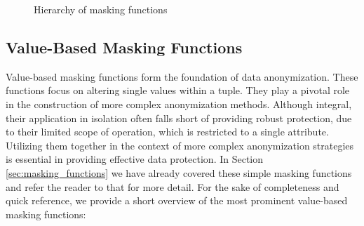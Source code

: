 \begin{figure}[ht]
    \vspace{-0.75cm}
    \caption{Hierarchy of masking functions}\label{fig:hierarchy_mf} 
\end{figure}

\subsection{Value-Based Masking Functions}
Value-based masking functions form the foundation of data anonymization. These functions focus on altering single values within a tuple. They play a pivotal role in the construction of more complex anonymization methods. Although integral, their application in isolation often falls short of providing robust protection, due to their limited scope of operation, which is restricted to a single attribute. Utilizing them together in the context of more complex anonymization strategies is essential in providing effective data protection. In Section \ref{sec:masking_functions} we have already covered these simple masking functions and refer the reader to that for more detail. For the sake of completeness and quick reference, we provide a short overview of the most prominent value-based masking functions: 

